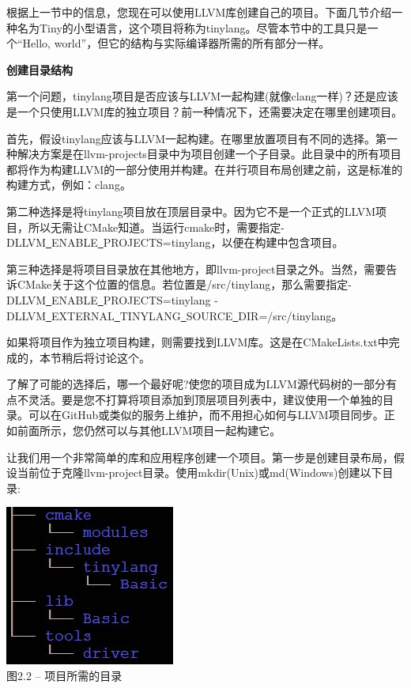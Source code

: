 根据上一节中的信息，您现在可以使用LLVM库创建自己的项目。下面几节介绍一种名为Tiny的小型语言，这个项目将称为tinylang。尽管本节中的工具只是一个“Hello, world”，但它的结构与实际编译器所需的所有部分一样。\par

\hspace*{\fill} \par %
\textbf{创建目录结构}

第一个问题，tinylang项目是否应该与LLVM一起构建(就像clang一样)？还是应该是一个只使用LLVM库的独立项目？前一种情况下，还需要决定在哪里创建项目。\par

首先，假设tinylang应该与LLVM一起构建。在哪里放置项目有不同的选择。第一种解决方案是在llvm-projects目录中为项目创建一个子目录。此目录中的所有项目都将作为构建LLVM的一部分使用并构建。在并行项目布局创建之前，这是标准的构建方式，例如：clang。\par

第二种选择是将tinylang项目放在顶层目录中。因为它不是一个正式的LLVM项目，所以无需让CMake知道。当运行cmake时，需要指定-DLLVM\underline{~}ENABLE\underline{~}PROJECTS=tinylang，以便在构建中包含项目。\par

第三种选择是将项目目录放在其他地方，即llvm-project目录之外。当然，需要告诉CMake关于这个位置的信息。若位置是/src/tinylang，那么需要指定-DLLVM\underline{~}ENABLE\underline{~}PROJECTS=tinylang -DLLVM\underline{~}EXTERNAL\underline{~}TINYLANG\underline{~}SOURCE\underline{~}DIR=/src/tinylang。\par

如果将项目作为独立项目构建，则需要找到LLVM库。这是在CMakeLists.txt中完成的，本节稍后将讨论这个。\par

了解了可能的选择后，哪一个最好呢?使您的项目成为LLVM源代码树的一部分有点不灵活。要是您不打算将项目添加到顶层项目列表中，建议使用一个单独的目录。可以在GitHub或类似的服务上维护，而不用担心如何与LLVM项目同步。正如前面所示，您仍然可以与其他LLVM项目一起构建它。\par

让我们用一个非常简单的库和应用程序创建一个项目。第一步是创建目录布局，假设当前位于克隆llvm-project目录。使用mkdir(Unix)或md(Windows)创建以下目录:\par

\hspace*{\fill} \par %
\begin{center}
\includegraphics{content/1/chapter2/images/2.jpg}\\
图2.2 – 项目所需的目录
\end{center}

